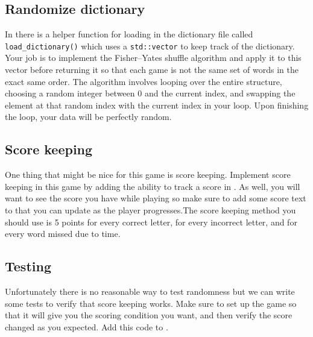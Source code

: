 \documentclass{tufte-handout}
\begin{document}
\subsection{Randomize dictionary}

In  there is a helper function for loading in the
dictionary file called \verb!load_dictionary()! which uses a \verb!std::vector!
to keep track of the dictionary. Your job is to implement the Fisher–Yates
shuffle algorithm and apply it to this vector before returning it so that each
game is not the same set of words in the exact same order. The algorithm
involves looping over the entire structure, choosing a random integer between 0
and the current index, and swapping the element at that random index with the
current index in your loop. Upon finishing the loop, your data will be
perfectly random.

\subsection{Score keeping}

One thing that might be nice for this game is score keeping. Implement score
keeping in this game by adding the ability to track a score in
. As well, you will want to see the score you have while
playing so make sure to add some score text to  that you
can update as the player progresses.The score keeping method you should use is
5 points for every correct letter,  for every incorrect letter, and  for
every word missed due to time.

\subsection{Testing}

Unfortunately there is no reasonable way to test randomness but we can write
some tests to verify that score keeping works. Make sure to set up the game so
that it will give you the scoring condition you want, and then verify the score
changed as you expected. Add this code to .
\end{document}
